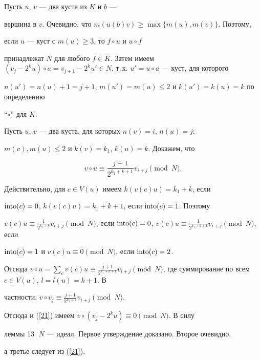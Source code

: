 \begin{pf} Пусть $u$, $v$ --- два куста из $K$ и $b$ ---


вершина в $v$. Очевидно, что $m(u(b)v)\ge \max\{m(u),m(v)\}$. Поэтому,


если $u$ --- куст с $m(u)\ge 3$, то $f\circ u$ и $u\circ f$


принадлежат $N$ для любого $f\in K$. Затем имеем $(v_j-2^ku)\circ a=


v_{j+1}-2^ku' \in N$, т.\,к. $u'=u\circ a$ --- куст, для которого


$n(u')=n(u)+1=j+1$, $m(u')=m(u)\le 2$ и $k(u')=k(u)=k$ по определению


``$\circ$'' для $K$.





Пусть $u$, $v$ --- два куста, для которых $n(v)=i$, $n(u)=j$;


$m(v),m(u)\le 2$ и $k(v)=k_1$, $k(u)=k$. Докажем, что


\begin{equation}\label{21}


v\circ u \equiv \frac{j+1}{2^{k_1+k+1}}v_{i+j} \pmod{N}.


\end{equation}


Действительно, для $c\in V(u)$ имеем $k(v(c)u)=k_1+k$, если


$\operatorname{into} (c)=0$, $k(v(c)u)=k_1+k+1$, если $\operatorname{into} (c)=1$. Поэтому


$v(c)u\equiv \frac{1}{2^{k_1+k}}v_{i+j} \pmod{N}$, если $\into (c)


=0$, $v(c)u\equiv \frac{1}{2^{k_1+k+1}}v_{i+j} \pmod{N}$, если


$\operatorname{into} (c)=1$ и $v(c)u\equiv 0\pmod{N}$, если $\operatorname{into} (c)=2$.


Отсюда $v\circ u= \sum\limits_c v(c)u\equiv \frac{j+1}{2^{k_1+k+1}}v_{i+j}


\pmod{N}$, где суммирование по всем $c\in V(u)$, $l=l(u)=k+1$. В


частности, $v\circ v_j\equiv \frac{j+1}{2^{k_1+1}}v_{i+j} \pmod{N}$.


Отсюда и (\ref{21}) имеем $v\circ (v_j-2^ku)\equiv 0\pmod{N}$. В силу


леммы 13 $\;N$ --- идеал. Первое утверждение доказано. Второе очевидно,


а третье следует из (\ref{21}).


\end{pf}





